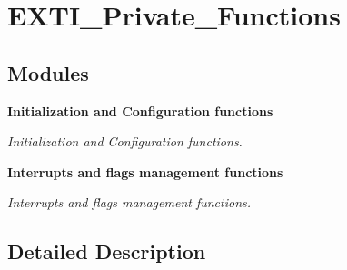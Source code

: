 \section{E\+X\+T\+I\+\_\+\+Private\+\_\+\+Functions}
\label{group__EXTI__Private__Functions}
\subsection*{Modules}
\begin{DoxyCompactItemize}
\item 
\textbf{ Initialization and Configuration functions}
\begin{DoxyCompactList}\small\item\em Initialization and Configuration functions. \end{DoxyCompactList}\item 
\textbf{ Interrupts and flags management functions}
\begin{DoxyCompactList}\small\item\em Interrupts and flags management functions. \end{DoxyCompactList}\end{DoxyCompactItemize}


\subsection{Detailed Description}
